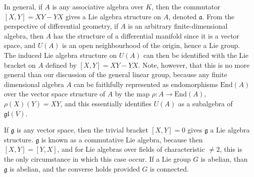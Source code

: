 \begin{example}
    In general, if $A$ is any associative algebra over $K$, then the commutator $[X,Y] = XY - YX$ gives a Lie algebra structure on $A$, denoted $\mathfrak{a}$. From the perspective of differential geometry, if $A$ is an arbitrary finite-dimensional algebra, then $A$ has the structure of a differential manifold since it is a vector space, and $U(A)$ is an open neighbourhood of the origin, hence a Lie group. The induced Lie algebra structure on $U(A)$ can then be identified with the Lie bracket on $A$ defined by $[X,Y] = XY - YX$. Note, however, that this is no more general than our discussion of the general linear group, because any finite dimensional algebra $A$ can be faithfully represented as endomorphisms $\text{End}(A)$ over the vector space structure of $A$ by the map $\rho: A \to \text{End}(A)$, $\rho(X)(Y) = XY$, and this essentially identifies $U(A)$ as a subalgebra of $\mathfrak{gl}(V)$.
\end{example}

\begin{example}
    If $\mathfrak{g}$ is any vector space, then the trivial bracket $[X,Y] = 0$ gives $\mathfrak{g}$ a Lie algebra structure. $\mathfrak{g}$ is known as a commutative Lie algebra, because then $[X,Y] = [Y,X]$, and for Lie algebras over fields of characteristic $\neq 2$, this is the only circumstance in which this case occur. If a Lie group $G$ is abelian, than $\mathfrak{g}$ is abelian, and the converse holds provided $G$ is connected.
\end{example}

